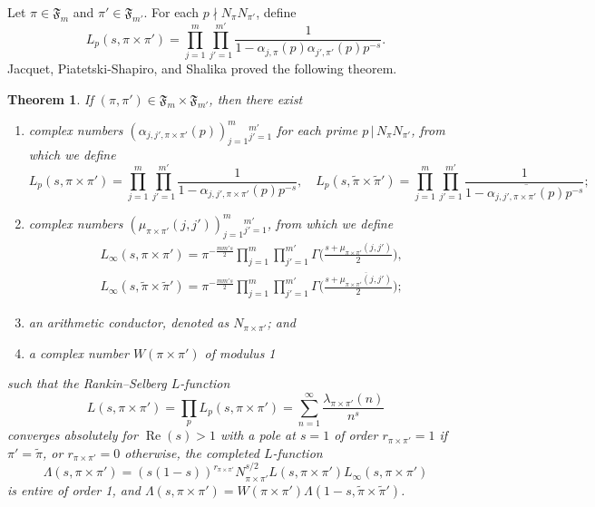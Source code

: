 \documentclass[12pt,reqno]{amsart}
\newtheorem{thm}{Theorem}[section]
\theoremstyle{remark}
\DeclareMathOperator{\Real}{Re}
\numberwithin{equation}{section}
\begin{document}
    Let $\pi \in \mathfrak{F}_m$ and $\pi' \in \mathfrak{F}_{m'}$.  For each $p \nmid N_{\pi}N_{\pi'}$, define
    \[
        L_p(s, \pi \times \pi')= \prod_{j=1}^{m} \prod_{j'=1}^{m'} \frac{1}{1-\alpha_{j,\pi}(p)\alpha_{j',\pi'}(p)p^{-s}}.
    \]
    Jacquet, Piatetski-Shapiro, and Shalika \cite{JPS} proved the following theorem. 

    \begin{thm}
    \label{thm:Rankin-Selberg}
    If $(\pi, \pi') \in \mathfrak{F}_m \times \mathfrak{F}_{m'}$, then there exist
    \begin{enumerate}
        \item complex numbers $(\alpha_{j,j', \pi \times \pi'}(p))_{j=1}^m{}_{j'=1}^{m'}$ for each prime $p\,|\, N_{\pi}N_{\pi'}$, from which we define 
        \[
            L_{p}(s,\pi\times\pi')=\prod_{j=1}^{m}\prod_{j'=1}^{m'}\frac{1}{1-\alpha_{j,j',\pi\times\pi'}(p) p^{-s}}, \quad L_{p}(s,\widetilde{\pi}\times\widetilde{\pi}')=\prod_{j=1}^{m}\prod_{j'=1}^{m'}\frac{1}{1-\overline{\alpha_{j,j',\pi\times\pi'}(p)} p^{-s}};
        \]
        \item  complex numbers $(\mu_{ \pi \times \pi'}(j,j'))_{j=1}^{m}{}_{j'=1}^{m'}$, from which we define 
        \begin{equation*}
        \begin{aligned}
            &L_{\infty}(s,\pi\times\pi') = \pi^{-\frac{mm's}{2}}\prod_{j=1}^{m}\prod_{j'=1}^{m'}\Gamma\Big(\frac{s+\mu_{\pi\times\pi'}(j,j')}{2}\Big),\\
            &L_{\infty}(s,\widetilde{\pi}\times\widetilde{\pi}') = \pi^{-\frac{mm's}{2}}\prod_{j=1}^{m}\prod_{j'=1}^{m'}\Gamma\Big(\frac{s+\overline{\mu_{\pi\times\pi'}(j,j')}}{2}\Big);    
        \end{aligned}   
        \end{equation*} 
    \item an arithmetic conductor, denoted as $N_{\pi \times \pi'}$; and 
    \item a complex number $W(\pi \times \pi')$ of modulus 1
    \end{enumerate}
    such that the Rankin--Selberg $L$-function
    \[   L(s,\pi\times\pi')=\prod_{p}L_{p}(s,\pi\times\pi') =\sum_{n=1}^{\infty}\frac{\lambda_{\pi\times\pi'}(n)}{n^s}
    \]
    converges absolutely for $\Real(s) > 1$ with a pole at $s=1$ of order $r_{\pi\times\pi'} = 1$ if  $\pi'=\widetilde{\pi}$, or $r_{\pi\times\pi'} =0$ otherwise,
    the completed $L$-function
    \begin{equation}
    \label{eqn:Lambdaspixpi'}
        \Lambda(s,\pi\times\pi')=(s(1-s))^{r_{\pi\times\pi'}}N_{\pi\times\pi'}^{s/2}L(s,\pi\times\pi')L_{\infty}(s,\pi\times\pi')
    \end{equation}
    is entire of order 1, and $\Lambda(s,\pi\times\pi')= W(\pi\times\pi')\Lambda(1-s,\widetilde{\pi}\times\widetilde{\pi}')$.
    \end{thm}
\end{document}
